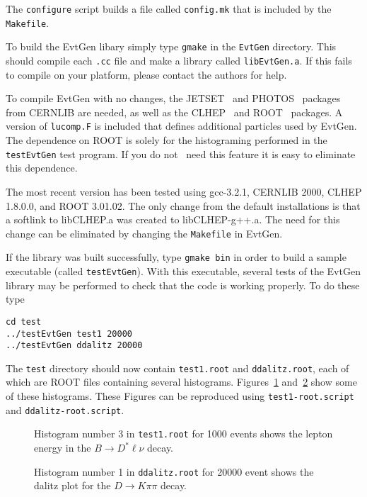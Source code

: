 The {\tt configure} script builds a file
called {\tt config.mk} that is included by the {\tt Makefile}.

To build the EvtGen libary simply type {\tt gmake} in
the {\tt EvtGen} directory.  This should compile each
{\tt .cc} file and make a library called {\tt libEvtGen.a}.  If
this fails to compile on your platform, please contact the
authors for help.  

To compile EvtGen with no changes, the
JETSET~\cite{jetset} 
and PHOTOS~\cite{Was92} packages from CERNLIB are needed, as well
as the CLHEP~\cite{clhep} and ROOT~\cite{root} packages.  
A version of {\tt lucomp.F} is included that defines 
additional particles used by EvtGen. 
The
dependence on ROOT is solely for the histograming 
performed in the {\tt testEvtGen} test program.  If you do not \
need this feature it is easy to eliminate this dependence. 

The most recent version has been tested using gcc-3.2.1, CERNLIB 2000,
CLHEP 1.8.0.0, and ROOT 3.01.02.  The only change from the
default installations is that a softlink to libCLHEP.a was
created to libCLHEP-g++.a.  The need for this change can be eliminated by
changing the {\tt Makefile} in EvtGen.

If the library was built successfully, type {\tt gmake bin}
in order to build a sample executable (called {\tt testEvtGen}).  With
this executable, several tests of the EvtGen library may
be performed to check that the code is working properly.  To 
do these type
\begin{verbatim}
cd test
../testEvtGen test1 20000
../testEvtGen ddalitz 20000
\end{verbatim}
The {\tt test} directory should now contain {\tt test1.root} and
{\tt ddalitz.root}, each of which are ROOT files containing
several histograms.  Figures~\ref{fig:test1} and~\ref{fig:ddalitz}
show some of these histograms.  These Figures can be 
reproduced using {\tt test1-root.script} and
{\tt ddalitz-root.script}.

\begin{figure}
\caption{Histogram number 3 in {\tt test1.root} for 1000 events shows
the lepton energy in the $B\rightarrow D^{*}\ell\nu$ decay.}
\label{fig:test1}
\end{figure}

\begin{figure}
\caption{Histogram number 1 in {\tt ddalitz.root} for 20000 event shows
the dalitz plot for the $D\rightarrow K\pi\pi$ decay.}
\label{fig:ddalitz}
\end{figure}








 
